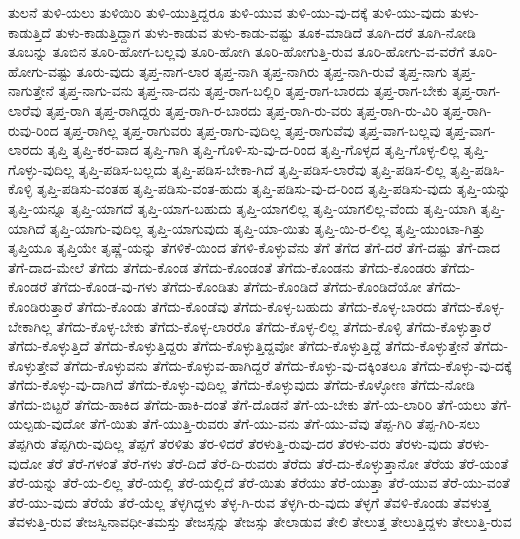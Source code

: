 {ತುಲನೆ
ತುಳಿ-ಯಲು
ತುಳಿಯಿರಿ
ತುಳಿ-ಯುತ್ತಿದ್ದರೂ
ತುಳಿ-ಯುವ
ತುಳಿ-ಯು-ವು-ದಕ್ಕೆ
ತುಳಿ-ಯು-ವುದು
ತುಳು-ಕಾಡುತ್ತಿದೆ
ತುಳು-ಕಾಡುತ್ತಿದ್ದಾಗ
ತುಳು-ಕಾಡುವ
ತುಳು-ಕಾಡು-ವಷ್ಟು
ತೂಕ-ಮಾಡಿದೆ
ತೂಗಿ-ದರೆ
ತೂಗಿ-ನೋಡಿ
ತೂಬನ್ನು
ತೂಬಿನ
ತೂರಿ-ಹೋಗ-ಬಲ್ಲವು
ತೂರಿ-ಹೋಗಿ
ತೂರಿ-ಹೋಗುತ್ತಿ-ರುವ
ತೂರಿ-ಹೋಗು-ವ-ವರೆಗೆ
ತೂರಿ-ಹೋಗು-ವಷ್ಟು
ತೂರು-ವುದು
ತೃಪ್ತ-ನಾಗ-ಲಾರ
ತೃಪ್ತ-ನಾಗಿ
ತೃಪ್ತ-ನಾಗಿರು
ತೃಪ್ತ-ನಾಗಿ-ರುವೆ
ತೃಪ್ತ-ನಾಗು
ತೃಪ್ತ-ನಾಗುತ್ತೇನೆ
ತೃಪ್ತ-ನಾಗು-ವನು
ತೃಪ್ತ-ನಾ-ದನು
ತೃಪ್ತ-ರಾಗ-ಬಲ್ಲಿರಿ
ತೃಪ್ತ-ರಾಗ-ಬಾರದು
ತೃಪ್ತ-ರಾಗ-ಬೇಕು
ತೃಪ್ತ-ರಾಗ-ಲಾರೆವು
ತೃಪ್ತ-ರಾಗಿ
ತೃಪ್ತ-ರಾಗಿದ್ದರು
ತೃಪ್ತ-ರಾಗಿ-ರ-ಬಾರದು
ತೃಪ್ತ-ರಾಗಿ-ರು-ವರು
ತೃಪ್ತ-ರಾಗಿ-ರು-ವಿರಿ
ತೃಪ್ತ-ರಾಗಿ-ರುವು-ರಿಂದ
ತೃಪ್ತ-ರಾಗಿಲ್ಲ
ತೃಪ್ತ-ರಾಗುವರು
ತೃಪ್ತ-ರಾಗು-ವುದಿಲ್ಲ
ತೃಪ್ತ-ರಾಗುವೆವು
ತೃಪ್ತ-ವಾಗ-ಬಲ್ಲವು
ತೃಪ್ತ-ವಾಗ-ಲಾರದು
ತೃಪ್ತಿ
ತೃಪ್ತಿ-ಕರ-ವಾದ
ತೃಪ್ತಿ-ಗಾಗಿ
ತೃಪ್ತಿ-ಗೊಳಿ-ಸು-ವು-ದ-ರಿಂದ
ತೃಪ್ತಿ-ಗೊಳ್ಳದ
ತೃಪ್ತಿ-ಗೊಳ್ಳ-ಲಿಲ್ಲ
ತೃಪ್ತಿ-ಗೊಳ್ಳು-ವುದಿಲ್ಲ
ತೃಪ್ತಿ-ಪಡಿಸ-ಬಲ್ಲದು
ತೃಪ್ತಿ-ಪಡಿಸ-ಬೇಕಾ-ಗಿದೆ
ತೃಪ್ತಿ-ಪಡಿಸ-ಲಾರೆವು
ತೃಪ್ತಿ-ಪಡಿಸ-ಲಿಲ್ಲ
ತೃಪ್ತಿ-ಪಡಿಸಿ-ಕೊಳ್ಳಿ
ತೃಪ್ತಿ-ಪಡಿಸು-ವಂತಹ
ತೃಪ್ತಿ-ಪಡಿಸು-ವಂತ-ಹುದು
ತೃಪ್ತಿ-ಪಡಿಸು-ವು-ದ-ರಿಂದ
ತೃಪ್ತಿ-ಪಡಿಸು-ವುದು
ತೃಪ್ತಿ-ಯನ್ನು
ತೃಪ್ತಿ-ಯನ್ನೂ
ತೃಪ್ತಿ-ಯಾಗದೆ
ತೃಪ್ತಿ-ಯಾಗ-ಬಹುದು
ತೃಪ್ತಿ-ಯಾಗಲಿಲ್ಲ
ತೃಪ್ತಿ-ಯಾಗಲಿಲ್ಲ-ವೆಂದು
ತೃಪ್ತಿ-ಯಾಗಿ
ತೃಪ್ತಿ-ಯಾಗಿದೆ
ತೃಪ್ತಿ-ಯಾಗು-ವುದಿಲ್ಲ
ತೃಪ್ತಿ-ಯಾಗುವುದು
ತೃಪ್ತಿ-ಯಾ-ಯಿತು
ತೃಪ್ತಿ-ಯಿ-ರ-ಲಿಲ್ಲ
ತೃಪ್ತಿ-ಯುಂಟಾ-ಗಿತ್ತು
ತೃಪ್ತಿಯೂ
ತೃಪ್ತಿಯೇ
ತೃಷ್ಣೆ-ಯನ್ನು
ತೆಗಳಿಕೆ-ಯಿಂದ
ತೆಗಳಿ-ಕೊಳ್ಳುವೆನು
ತೆಗೆ
ತೆಗೆದ
ತೆಗೆ-ದರೆ
ತೆಗೆ-ದಷ್ಟು
ತೆಗೆ-ದಾದ
ತೆಗೆ-ದಾದ-ಮೇಲೆ
ತೆಗೆದು
ತೆಗೆದು-ಕೊಂಡ
ತೆಗೆದು-ಕೊಂಡಂತೆ
ತೆಗೆದು-ಕೊಂಡನು
ತೆಗೆದು-ಕೊಂಡರು
ತೆಗೆದು-ಕೊಂಡರೆ
ತೆಗೆದು-ಕೊಂಡ-ವು-ಗಳು
ತೆಗೆದು-ಕೊಂಡಿತು
ತೆಗೆದು-ಕೊಂಡಿದೆ
ತೆಗೆದು-ಕೊಂಡಿದೆಯೋ
ತೆಗೆದು-ಕೊಂಡಿರುತ್ತಾರೆ
ತೆಗೆದು-ಕೊಂಡು
ತೆಗೆದು-ಕೊಂಡೆವು
ತೆಗೆದು-ಕೊಳ್ಳ-ಬಹುದು
ತೆಗೆದು-ಕೊಳ್ಳ-ಬಾರದು
ತೆಗೆದು-ಕೊಳ್ಳ-ಬೇಕಾಗಿಲ್ಲ
ತೆಗೆದು-ಕೊಳ್ಳ-ಬೇಕು
ತೆಗೆದು-ಕೊಳ್ಳ-ಲಾರರೊ
ತೆಗೆದು-ಕೊಳ್ಳ-ಲಿಲ್ಲ
ತೆಗೆದು-ಕೊಳ್ಳಿ
ತೆಗೆದು-ಕೊಳ್ಳುತ್ತಾರೆ
ತೆಗೆದು-ಕೊಳ್ಳುತ್ತಿದೆ
ತೆಗೆದು-ಕೊಳ್ಳುತ್ತಿದ್ದರು
ತೆಗೆದು-ಕೊಳ್ಳುತ್ತಿದ್ದವೋ
ತೆಗೆದು-ಕೊಳ್ಳುತ್ತಿದ್ದೆ
ತೆಗೆದು-ಕೊಳ್ಳುತ್ತೇನೆ
ತೆಗೆದು-ಕೊಳ್ಳುತ್ತೇವೆ
ತೆಗೆದು-ಕೊಳ್ಳುವನು
ತೆಗೆದು-ಕೊಳ್ಳುವ-ಹಾಗಿದ್ದರೆ
ತೆಗೆದು-ಕೊಳ್ಳು-ವು-ದಕ್ಕಿಂತಲೂ
ತೆಗೆದು-ಕೊಳ್ಳು-ವು-ದಕ್ಕೆ
ತೆಗೆದು-ಕೊಳ್ಳು-ವು-ದಾಗಿದೆ
ತೆಗೆದು-ಕೊಳ್ಳು-ವುದಿಲ್ಲ
ತೆಗೆದು-ಕೊಳ್ಳುವುದು
ತೆಗೆದು-ಕೊಳ್ಳೋಣ
ತೆಗೆದು-ನೋಡಿ
ತೆಗೆದು-ಬಿಟ್ಟರೆ
ತೆಗೆದು-ಹಾಕಿದ
ತೆಗೆದು-ಹಾಕಿ-ದಂತೆ
ತೆಗೆ-ದೊಡನೆ
ತೆಗೆ-ಯ-ಬೇಕು
ತೆಗೆ-ಯ-ಲಾರಿರಿ
ತೆಗೆ-ಯಲು
ತೆಗೆ-ಯಲ್ಪಡು-ವುದೋ
ತೆಗೆ-ಯಿತು
ತೆಗೆ-ಯುತ್ತಿ-ರುವರು
ತೆಗೆ-ಯು-ವನು
ತೆಗೆ-ಯು-ವೆವು
ತೆಪ್ಪ-ಗಿರಿ
ತೆಪ್ಪ-ಗಿರಿ-ಸಲು
ತೆಪ್ಪಗಿರು
ತೆಪ್ಪಗಿರು-ವುದಿಲ್ಲ
ತೆಪ್ಪಗೆ
ತೆರಳಿತು
ತೆರ-ಳಿದರೆ
ತೆರಳುತ್ತಿ-ರುವು-ದರ
ತೆರಳು-ವರು
ತೆರಳು-ವುದು
ತೆರಳು-ವುದೋ
ತೆರೆ
ತೆರೆ-ಗಳಂತೆ
ತೆರೆ-ಗಳು
ತೆರೆ-ದಿದೆ
ತೆರೆ-ದಿ-ರುವರು
ತೆರೆದು
ತೆರೆ-ದು-ಕೊಳ್ಳುತ್ತಾನೋ
ತೆರೆಯ
ತೆರೆ-ಯಂತೆ
ತೆರೆ-ಯನ್ನು
ತೆರೆ-ಯ-ಲಿಲ್ಲ
ತೆರೆ-ಯಲ್ಲಿ
ತೆರೆ-ಯಲ್ಲಿದೆ
ತೆರೆ-ಯಿತು
ತೆರೆಯು
ತೆರೆ-ಯುತ್ತಾ
ತೆರೆ-ಯುವ
ತೆರೆ-ಯು-ವಂತೆ
ತೆರೆ-ಯು-ವುದು
ತೆರೆಯೆ
ತೆರೆ-ಯೆಲ್ಲ
ತೆಳ್ಳಗಿದ್ದಳು
ತೆಳ್ಳ-ಗಿ-ರುವ
ತೆಳ್ಳಗಿ-ರು-ವುದು
ತೆಳ್ಳಗೆ
ತೆವಳಿ-ಕೊಂಡು
ತೆವಳುತ್ತ
ತೆವಳುತ್ತಿ-ರುವ
ತೇಜಸ್ವಿನಾವಧೀ-ತಮಸ್ತು
ತೇಜಸ್ಸನ್ನು
ತೇಜಸ್ಸು
ತೇಲಾಡುವ
ತೇಲಿ
ತೇಲುತ್ತ
ತೇಲುತ್ತಿದ್ದಳು
ತೇಲುತ್ತಿ-ರುವ
}
